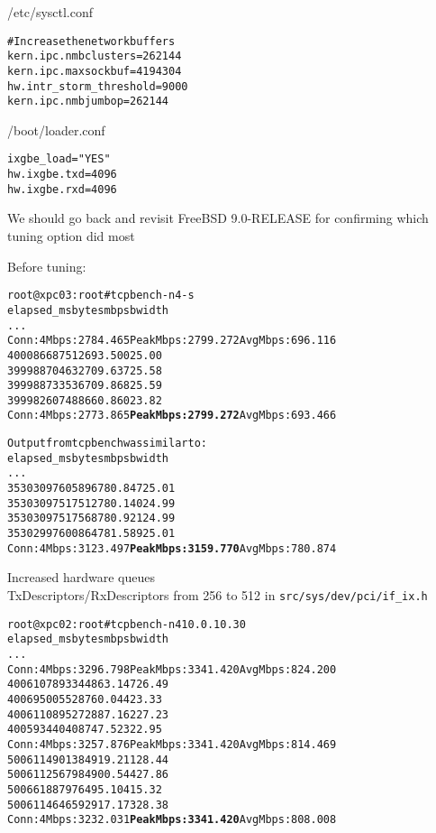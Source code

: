 \documentclass[20pt,landscape,a4paper,footrule]{foils}
\begin{document}

/etc/sysctl.conf
\begin{alltt}\small
# Increase the network buffers
kern.ipc.nmbclusters=262144
kern.ipc.maxsockbuf=4194304
hw.intr_storm_threshold=9000
kern.ipc.nmbjumbop=262144
\end{alltt}

/boot/loader.conf
\begin{alltt}\small
ixgbe_load="YES"
hw.ixgbe.txd=4096
hw.ixgbe.rxd=4096
\end{alltt}



We should go back and revisit FreeBSD 9.0-RELEASE for confirming which tuning option did most


Before tuning:
\begin{alltt}\small
root@xpc03:root# tcpbench -n 4 -s
  elapsed_ms          bytes         mbps   bwidth
...
Conn:   4 Mbps:     2784.465 Peak Mbps:     2799.272 Avg Mbps:      696.116
        4000       86687512      693.500   25.00%
        3999       88704632      709.637   25.58%
        3999       88733536      709.868   25.59%
        3999       82607488      660.860   23.82%
Conn:   4 Mbps:     2773.865 {\bf Peak Mbps:     2799.272} Avg Mbps:      693.466
\end{alltt}



\begin{alltt}\small
Output from tcpbench was similar to:
  elapsed_ms          bytes         mbps   bwidth
...
     353030       97605896      780.847   25.01% 
     353030       97517512      780.140   24.99% 
     353030       97517568      780.921   24.99% 
     353029       97600864      781.589   25.01% 
Conn:   4 Mbps:     3123.497 {\bf Peak Mbps:     3159.770} Avg Mbps:      780.874
\end{alltt}

Increased hardware queues\\
TxDescriptors/RxDescriptors from 256 to 512
in \verb+src/sys/dev/pci/if_ix.h+
\begin{alltt}\small
root@xpc02:root# tcpbench -n 4 10.0.10.30
 elapsed_ms          bytes         mbps   bwidth 
...
Conn:   4 Mbps:     3296.798 Peak Mbps:     3341.420 Avg Mbps:      824.200
       4006      107893344      863.147   26.49% 
       4006       95005528      760.044   23.33% 
       4006      110895272      887.162   27.23% 
       4005       93440408      747.523   22.95% 
Conn:   4 Mbps:     3257.876 Peak Mbps:     3341.420 Avg Mbps:      814.469
       5006      114901384      919.211   28.44% 
       5006      112567984      900.544   27.86% 
       5006       61887976      495.104   15.32% 
       5006      114646592      917.173   28.38% 
Conn:   4 Mbps:     3232.031 {\bf Peak Mbps:     3341.420} Avg Mbps:      808.008
\end{alltt}
\end{document}
